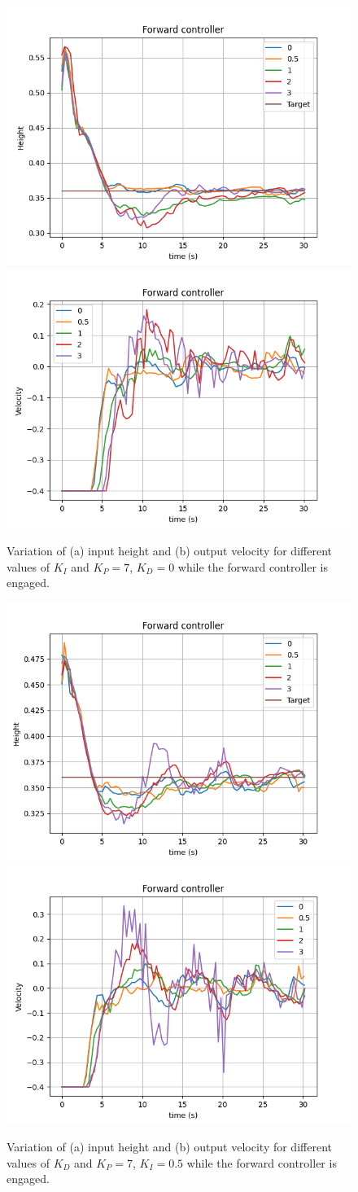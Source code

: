 \begin{figure}
  \centering
  \includegraphics[width=.45\linewidth]{img/pid/fwd/fwd_pos_p7_int_d0.png}
  \includegraphics[width=.45\linewidth]{img/pid/fwd/fwd_vel_p7_int_d0.png}
  \caption{Variation of (a) input height and (b) output velocity for different values of $K_{I}$ and $K_P=7$, $K_D=0$ while the forward controller is engaged.}\label{fig:tune-fwd-int}
\end{figure}
\begin{figure}
  \centering
  \includegraphics[width=.45\linewidth]{img/pid/fwd/fwd_pos_p7_i05_der.png}
  \includegraphics[width=.45\linewidth]{img/pid/fwd/fwd_vel_p7_i05_der.png}
  \caption{Variation of (a) input height and (b) output velocity for different values of $K_{D}$ and $K_P=7$, $K_I=0.5$ while the forward controller is engaged.}\label{fig:tune-fwd-der}
\end{figure}


